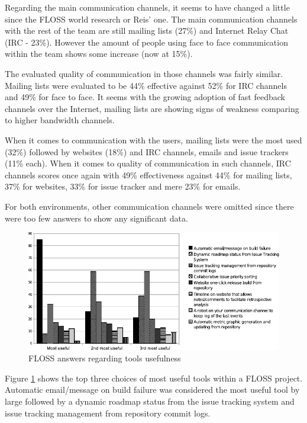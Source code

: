 \documentclass[lnbip]{svmultln}
\begin{document}
Regarding the main communication channels, it seems to have changed a
little since the FLOSS world research or Reis' one. The main
communication channels with the rest of the team are still mailing
lists (27\%) and Internet Relay Chat (IRC - 23\%). However the amount
of people using face to face communication within the team shows some
increase (now at 15\%).

The evaluated quality of communication in those channels was fairly
similar. Mailing lists were evaluated to be 44\% effective against
52\% for IRC channels and 49\% for face to face. It seems with the
growing adoption of fast feedback channels over the Internet, mailing
lists are showing signs of weakness comparing to higher bandwidth
channels.

When it comes to communication with the users, mailing lists were the
most used (32\%) followed by websites (18\%) and IRC channels, emails
and issue trackers (11\% each). When it comes to quality of
communication in such channels, IRC channels scores once again with
49\% effectiveness against 44\% for mailing lists, 37\% for websites,
33\% for issue tracker and mere 23\% for emails.

For both environments, other communication channels were omitted since
there were too few answers to show any significant data.

\begin{figure}[htb]
  \centering
  \includegraphics{floss-tools.pdf}
  \caption{FLOSS answers regarding tools usefulness}
  \label{fig:floss-tools}
\end{figure}

Figure \ref{fig:floss-tools} shows the top three choices of most
useful tools within a FLOSS project. Automatic email/message on build
failure was considered the most useful tool by large followed by a
dynamic roadmap status from the issue tracking system and issue
tracking management from repository commit logs.
\end{document}
